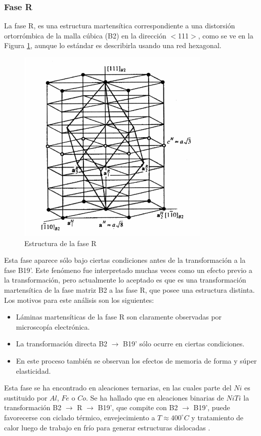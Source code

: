 \documentclass[12pt]{article}
\theoremstyle{definition}
\theoremstyle{remark}
\begin{document}
\subsubsection{Fase R}
La fase R, es una estructura martensítica correspondiente a una distorsión
ortorrómbica de la malla cúbica (B2) en la dirección $<$111$>$, como se ve en la Figura \ref{RPhase}, aunque lo estándar es describirla usando una red hexagonal.
\begin{figure}[H]
	\centering	
	\includegraphics[scale=0.5]{img/RPhase.png}
	\caption{Estructura de la fase R}
	\label{RPhase}
\end{figure}

Esta fase aparece sólo bajo ciertas condiciones antes de la transformación a la fase B19'. Este fenómeno fue interpretado muchas veces como un efecto previo a la transformación, pero actualmente lo aceptado es que es una transformación martensítica de la fase matriz B2 a las fase R, que posee una estructura distinta. Los motivos para este análisis son los siguientes:
\begin{itemize}
	\item Láminas martensíticas de la fase R son claramente observadas por microscopía electrónica.
	\item La transformación directa B2 $\rightarrow$ B19' sólo ocurre en ciertas condiciones.
	\item En este proceso también se observan los efectos de memoria de forma y súper elasticidad.
\end{itemize}


Esta fase se ha encontrado en aleaciones ternarias, en las cuales parte del $Ni$ es sustituido por $Al$, $Fe$ o $Co$. Se ha hallado que en  aleaciones binarias de $NiTi$ la transformación B2 $\rightarrow$ R $\rightarrow$ B19', que compite con B2 $\rightarrow$ B19', puede favorecerse con ciclado térmico, envejecimiento a $T \approx 400 ^\circ C$ y tratamiento de calor luego de trabajo en frío para generar estructuras dislocadas \cite{Santamarta}\cite{ThinFilm}\cite{TiNi}. 
\end{document}
